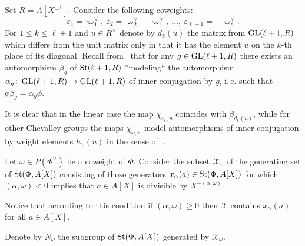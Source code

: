 \begin{example} \label{exm:chi-linear}
Set $R = A[X^{\pm 1}]$.
Consider the following coweights:
\[\varepsilon_1 = \varpi_1^\vee,\ \varepsilon_2 = \varpi_2^\vee - \varpi_1^\vee,\ \ldots,\ \varepsilon_{\ell+1} = -\varpi^\vee_\ell.\]
For $1\leq k\leq \ell+1$ and $u \in R^\times$ denote by $d_k(u)$ the matrix from $\operatorname{GL}(\ell+1, R)$ which differs from the unit matrix only in that it has the element $u$ on the $k$-th place of its diagonal.
Recall from~\cite[Corollary~4]{Ka77} that for any $g \in \operatorname{GL}(\ell+1, R)$ there exists an automorphism $\beta_g$ of $\operatorname{St}(\ell+1, R)$ ''modeling`` the automorphism $\alpha_g \colon \operatorname{GL}(\ell+1, R) \to \operatorname{GL}(\ell+1, R)$ of inner conjugation by $g$, i.\,e. such that $\phi \beta_g = \alpha_g \phi$.


It is clear that in the linear case the map $\chi_{\varepsilon_k, u}$ coincides with $\beta_{d_k(u)}$,
while for other Chevalley groups the maps $\chi_{\omega, u}$ model automorphisms of inner conjugation by weight elements $h_\omega(u)$ in the sense of~\cite[\S~4]{Vav09}.
\end{example}


Let $\omega \in P(\Phi^\vee)$ be a coweight of $\Phi$.
Consider the subset $\mathcal{X}_\omega$ of the generating set of $\operatorname{St}(\Phi, A[X])$ consisting of those generators $x_{\alpha}(a) \in \operatorname{St}(\Phi, A[X])$ for which
$(\alpha, \omega) < 0$ implies that $a \in A[X]$ is divisible by $X^{-(\alpha, \omega)}$.
\begin{rem}
    Notice that according to this condition if $(\alpha, \omega) \geq 0$ then $\mathcal{X}$ contains $x_\alpha(a)$ for all $a \in A[X]$.
\end{rem}
Denote by $N_\omega$ the subgroup of $\operatorname{St}(\Phi, A[X])$ generated by $\mathcal{X}_\omega$.


